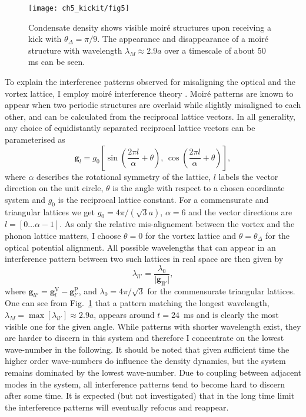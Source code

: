 	\begin{figure}[bt]
        \centering
		\texttt{[image: ch5\_kickit/fig5]}
		\caption[Oscillation of moir\'e wavelength.]{Condensate density shows visible moir\'e structures upon receiving a kick with $\theta_\Delta=\pi/9$. The appearance and disappearance of a moir\'e structure with wavelength $\lambda_M \approx 2.9 a$ over a timescale of about $50$ ms can be seen.}
		\label{fig:dtheta20_ev}
	\end{figure}

    To explain the interference patterns observed for misaligning the optical and the vortex lattice, I employ moir\'e interference theory \cite{SS:Hermann_jpcm_2012}. Moir\'e patterns are known to appear when two periodic structures are overlaid while slightly misaligned to each other, and can be calculated from the reciprocal lattice vectors. In all generality, any choice of equidistantly separated reciprocal lattice vectors can be parameterised as
    	\begin{equation}
    		\mathbf{g}_{l} = g_0 \left[ \sin\left( \frac{2\pi l}{\alpha}+\theta \right),\, \cos\left( \frac{2\pi l}{\alpha} +\theta\right) \right],
    	\end{equation}
    where $\alpha$ describes the rotational symmetry of the lattice, $l$ labels the vector direction on the unit circle, $\theta$ is the angle with respect to a chosen coordinate system and $g_0$ is the reciprocal lattice constant. For a commensurate and triangular lattices we get $g_0=4\pi/(\sqrt{3}a)$, $\alpha=6$ and the vector directions are $l=\left[0\dots\alpha-1\right]$. As only the relative mis-alignement between the vortex and the phonon lattice matters, I choose $\theta=0$ for the vortex lattice and $\theta=\theta_\Delta$ for the optical potential alignment.
    All possible wavelengths that can appear in an interference pattern between two such lattices in real space are then given by
    	\begin{equation}
    		\lambda_{ll'} = \frac{\lambda_0}{|\mathbf{\mathbf{g}_{ll'}|}},
    		\label{eq:InterferenceVectors}
    	\end{equation}
    where
    $\mathbf{g}_{ll'}=\mathbf{g}_{l}^{\text{V}}-\mathbf{g}_{l'}^{\text{P}}$, and
    $\lambda_0 = 4\pi/\sqrt{3}$ for the commensurate triangular lattices.
    One can see from Fig.~\ref{fig:dtheta20_ev} that a pattern matching the longest wavelength, $\lambda_M= \max[\lambda_{ll'}] \approx 2.9 a$, appears around $t=24$~ms and is clearly the most visible one for the given angle. While patterns with shorter wavelength exist, they are harder to discern in this system and therefore I concentrate on the lowest wave-number in the following. It should be noted that given sufficient time the higher order wave-numbers do influence the density dynamics, but the system remains dominated by the lowest wave-number. Due to coupling between adjacent modes in the system, all interference patterns tend to become hard to discern after some time. It is expected (but not investigated) that in the long time limit the interference patterns will eventually refocus and reappear.

